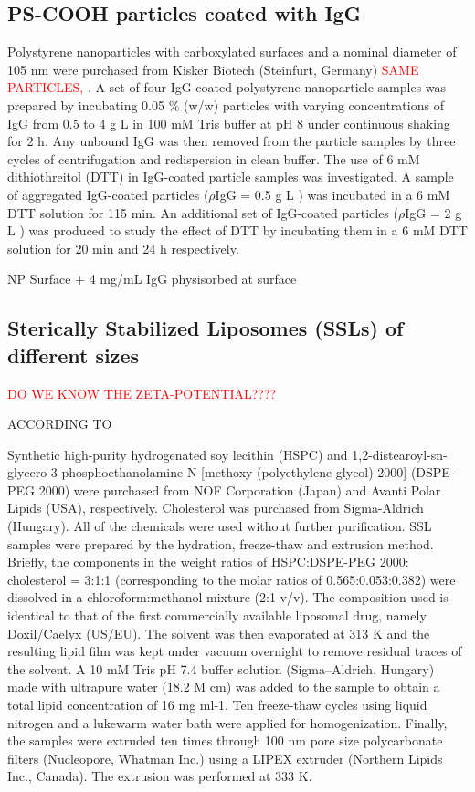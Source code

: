 \subsection{PS-COOH particles coated with IgG}

Polystyrene nanoparticles with carboxylated surfaces and a nominal diameter of 105 nm were purchased from Kisker Biotech (Steinfurt, Germany) \textcolor{red}{SAME PARTICLES, \cite{minelli_characterization_2014}}. A set of four IgG-coated polystyrene nanoparticle samples was prepared by incubating 0.05 $\%$ (w/w) particles with varying concentrations of IgG from 0.5 to 4 g L in 100 mM Tris buffer at pH 8 under continuous shaking for 2 h. Any unbound IgG was then removed from the particle samples by three cycles of centrifugation and redispersion in clean buffer. The use of 6 mM dithiothreitol (DTT) in IgG-coated particle samples was investigated. A sample of aggregated IgG-coated particles ($\rho$IgG = 0.5 g L ) was incubated in a 6 mM DTT solution for 115 min. An additional set of IgG-coated particles ($\rho$IgG = 2 g L ) was produced to study the effect of DTT by incubating them in a 6 mM DTT solution for 20 min and 24 h respectively.


NP Surface + 4 mg/mL IgG physisorbed at surface


\subsection{Sterically Stabilized Liposomes (SSLs) of different sizes}
\label{sec:materials_SSL}

\textcolor{red}{DO WE KNOW THE ZETA-POTENTIAL????}

ACCORDING TO \cite{varga_osmotic_2014}

Synthetic high-purity hydrogenated soy lecithin (HSPC) and 1,2-distearoyl-sn-glycero-3-phosphoethanolamine-N-[methoxy (polyethylene glycol)-2000] (DSPE-PEG 2000) were purchased from NOF Corporation (Japan) and Avanti Polar Lipids (USA), respectively. Cholesterol was purchased from Sigma-Aldrich (Hungary). All of the chemicals were used without further purification. SSL samples were prepared by the hydration, freeze-thaw and extrusion method. Briefly, the components in the weight ratios of HSPC:DSPE-PEG 2000: cholesterol = 3:1:1 (corresponding to the molar ratios of 0.565:0.053:0.382) were dissolved in a chloroform:methanol mixture (2:1 v/v). The composition used is identical to that of the first commercially available liposomal drug, namely Doxil/Caelyx (US/EU). The solvent was then evaporated at 313 K and the resulting lipid film was kept under vacuum overnight to remove residual traces of the solvent. A 10 mM Tris pH 7.4 buffer solution (Sigma–Aldrich, Hungary) made with ultrapure water (18.2 M  cm) was added to the sample to obtain a total lipid concentration of 16 mg ml-1. Ten freeze-thaw cycles using liquid nitrogen and a lukewarm water bath were applied for homogenization. Finally, the samples were extruded ten times through 100 nm pore size polycarbonate filters (Nucleopore, Whatman Inc.) using a LIPEX extruder (Northern Lipids Inc., Canada). The extrusion was performed at 333 K.

